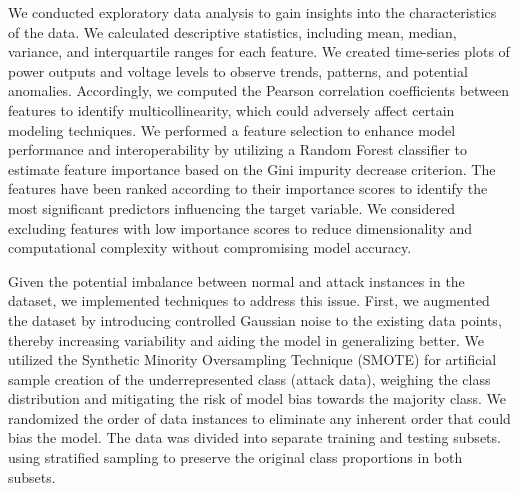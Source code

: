 We conducted exploratory data analysis to gain insights into the characteristics of the data. We calculated descriptive statistics, including mean, median, variance, and interquartile ranges for each feature. We created time-series plots of power outputs and voltage levels to observe trends, patterns, and potential anomalies. Accordingly, we computed the Pearson correlation coefficients between features to identify multicollinearity, which could adversely affect certain modeling techniques.  We performed a feature selection to enhance model performance and interoperability by utilizing a Random Forest classifier to estimate feature importance based on the Gini impurity decrease criterion. The features have been ranked according to their importance scores to identify the most significant predictors influencing the target variable. We considered excluding features with low importance scores to reduce dimensionality and computational complexity without compromising model accuracy.

Given the potential imbalance between normal and attack instances in the dataset, we implemented techniques to address this issue. First, we augmented the dataset by introducing controlled Gaussian noise to the existing data points, thereby increasing variability and aiding the model in generalizing better. We utilized the Synthetic Minority Oversampling Technique (SMOTE) for artificial sample creation of the underrepresented class (attack data), weighing the class distribution and mitigating the risk of model bias towards the majority class. We randomized the order of data instances to eliminate any inherent order that could bias the model. The data was divided into separate training and testing subsets. using stratified sampling to preserve the original class proportions in both subsets.

